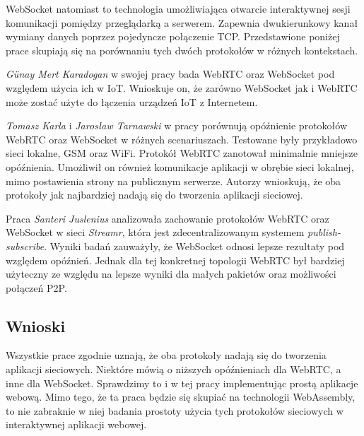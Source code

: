 \documentclass[language=polish,type=master]{aghmodern}
\begin{document}
WebSocket natomiast to technologia umożliwiająca otwarcie interaktywnej sesji komunikacji pomiędzy przeglądarką a serwerem.
Zapewnia dwukierunkowy kanał wymiany danych poprzez pojedyncze połączenie TCP.
Przedstawione poniżej prace skupiają się na porównaniu tych dwóch protokołów w różnych kontekstach.

\emph{G{\"u}nay Mert Karadogan} w swojej pracy \cite{websocket_webrtc_iot} bada WebRTC oraz WebSocket pod względem użycia ich w IoT\footnotemark{}.
Wnioskuje on, że zarówno WebSocket jak i WebRTC może zostać użyte do łączenia urządzeń IoT z Internetem.

\emph{Tomasz Karla} i \emph{Jarosław Tarnawski} w pracy \cite{websocket_webrtc_realtime} porównują opóźnienie protokołów WebRTC oraz WebSocket w różnych scenariuszach.
Testowane były przykładowo sieci lokalne, GSM oraz WiFi. Protokół WebRTC zanotował minimalnie mniejsze opóźnienia.
Umożliwił on również komunikacje aplikacji w obrębie sieci lokalnej\footnotemark{}, mimo postawienia strony na publicznym serwerze.
Autorzy wnioskują, że oba protokoły jak najbardziej nadają się do tworzenia aplikacji sieciowej.

Praca \cite{websocket_webrtc_streamr} \emph{Santeri Juslenius} analizowała zachowanie protokołów WebRTC oraz WebSocket w sieci \emph{Streamr}, która jest zdecentralizowanym systemem \emph{publish-subscribe}\footnotemark{}.
Wyniki badań zauważyły, że WebSocket odnosi lepsze rezultaty pod względem opóźnień.
Jednak dla tej konkretnej topologii WebRTC był bardziej użyteczny ze względu na lepsze wyniki dla małych pakietów oraz możliwości połączeń P2P.

\subsection{Wnioski}
Wszystkie prace zgodnie uznają, że oba protokoły nadają się do tworzenia aplikacji sieciowych.
Niektóre mówią o niższych opóźnieniach dla WebRTC, a inne dla WebSocket.
Sprawdzimy to i w tej pracy implementując prostą aplikacje webową.
Mimo tego, że ta praca będzie się skupiać na technologii WebAssembly, to nie zabraknie w niej badania prostoty użycia tych protokołów sieciowych w interaktywnej aplikacji webowej.
\end{document}
